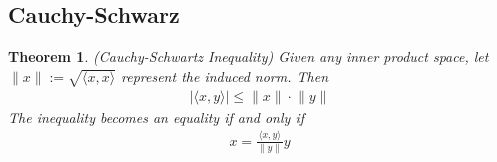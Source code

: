 \documentclass[12pt]{article}
\numberwithin{equation}{section} %
\theoremstyle{plain}
\newtheorem{thm}{Theorem}[section]
\theoremstyle{definition}
\theoremstyle{remark}
\begin{document}
\clearpage
\subsection{Cauchy-Schwarz}

\begin{thm}
\label{thm.cauchyscwarz}
\emph{(Cauchy-Schwartz Inequality)}
Given any inner product space, let
$\lVert x\rVert := \sqrt{\langle x,x\rangle}$ represent the induced
norm.  Then
\begin{align*}
  \lvert \langle x,y\rangle\rvert \leq \lVert x\rVert\cdot\lVert y\rVert
\end{align*}
The inequality becomes an equality if and only if
\begin{align*}
  x = \frac{\langle x,y\rangle}{\lVert y\rVert}y
\end{align*}
\end{thm}
\end{document}
